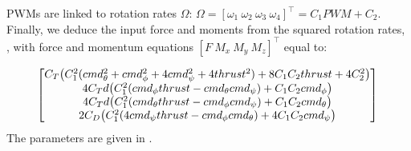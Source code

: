 \documentclass[anonymous=true,format=sigconf, screen=true, review=false]{acmart}
\begin{document}
PWMs are linked to rotation rates $\Omega$: 
$   \Omega = 
    [\omega_1 \ %
    \omega_2 \ %
    \omega_3 \ %
    \omega_4 
]^\top
 = C_1 PWM + C_2$. 
Finally, we deduce the input force and moments from the squared rotation rates,  , with force and momentum equations $[F \ M_x \ M_y \ M_z]^\top$ equal to:

\begin{equation} \label{eq:fulldynamic}
\begin{bmatrix}
  C_T \big(C_1^2(cmd_{\theta}^2 + cmd_{\phi}^2 + 4cmd_{\psi}^2 + 4thrust^2) + 8C_1 C_2 thrust + 4C_2^2 \big)\\
  4C_Td\big(C_1^2 (cmd_{\phi}thrust - cmd_{\theta}cmd_{\psi}) +  C_1C_2cmd_{\phi} \big)  \\
  4C_Td\big(C_1^2 (cmd_{\theta}thrust - cmd_{\phi}cmd_{\psi}) +  C_1C_2cmd_{\theta}  \big)  \\
  2C_D\big(C_1^2(4cmd_{\psi}thrust - cmd_{\phi}cmd_{\theta}) + 4C_1C_2cmd_{\psi} \big)\\
\end{bmatrix} \\
\end{equation}
\noindent The parameters are given in . 
\end{document}
